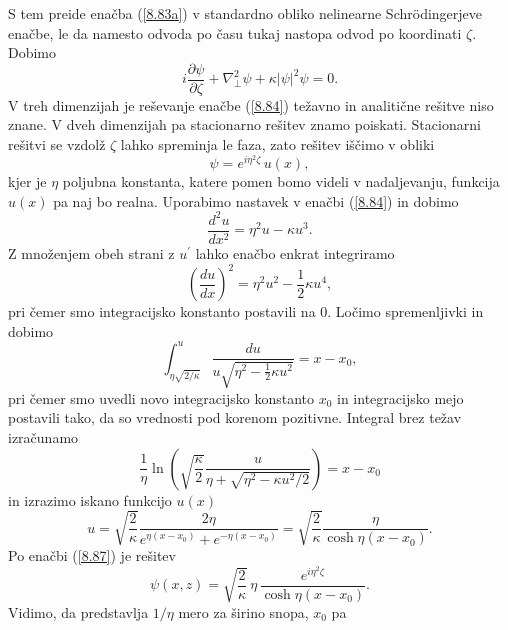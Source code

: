  S tem preide enačba (\ref{8.83a}) v standardno obliko nelinearne Schr\"odingerjeve
enačbe, le da namesto odvoda po času tukaj nastopa odvod po koordinati $\zeta$. Dobimo
\begin{equation}
i\frac{\partial\psi}{\partial\zeta}+\nabla_{\bot}^{2}\psi+\kappa\left|\psi\right|^{2}\psi=0.
\label{8.84}
\end{equation}
V treh dimenzijah je reševanje enačbe (\ref{8.84}) težavno in analitične
rešitve niso znane. V dveh dimenzijah pa stacionarno rešitev znamo
poiskati. Stacionarni rešitvi se vzdolž $\zeta$ lahko spreminja le faza, zato
rešitev iščimo v obliki 
\begin{equation}
\psi=e^{i\eta^{2}\zeta}\, u(x),
\label{8.87}
\end{equation}
 kjer je $\eta$ poljubna konstanta, katere pomen bomo videli v nadaljevanju, 
 funkcija $u(x)$ pa naj bo realna. 
Uporabimo nastavek v enačbi (\ref{8.84}) in dobimo
\begin{equation}
\frac{d^{2}u}{dx^{2}}=\eta^{2}u-\kappa u^{3}.
\end{equation}
 Z množenjem obeh strani z $u^{\prime}$ lahko enačbo enkrat integriramo
\begin{equation}
\left(\frac{du}{dx}\right)^{2}=\eta^{2}u^{2}-\frac{1}{2}\kappa u^{4},
\end{equation}
pri čemer smo integracijsko konstanto postavili na 0.
Ločimo spremenljivki in dobimo 
\begin{equation}
\int_{\eta\sqrt{2/\kappa}}^{u}\frac{du}{u\sqrt{\eta^{2}-\frac{1}{2}\kappa u^{2}}}=x-x_{0},
\label{8.85}
\end{equation}
pri čemer smo uvedli novo integracijsko konstanto $x_{0}$ in integracijsko mejo postavili 
tako, da so vrednosti pod korenom pozitivne.
Integral brez težav izračunamo
\begin{equation}
\frac{1}{\eta}\ln\left(\sqrt{\frac{\kappa}{2}}\frac{u}{\eta+
\sqrt{\eta^{2}-\kappa u^{2}/2}}\right)=x-x_{0}
\end{equation}
in izrazimo iskano funkcijo $u(x)$
\begin{equation}
u=\sqrt{\frac{2}{\kappa}}\frac{2 \eta }{e^{\eta(x-x_{0})}+e^{-\eta(x-x_{0})}}=
\sqrt{\frac{2}{\kappa}}\frac{\eta}{\cosh\eta(x-x_{0})}.
\label{8.86}
\end{equation}
Po enačbi (\ref{8.87}) je rešitev
\begin{equation}
\psi(x,z)=\sqrt{\frac{2}{\kappa}}\,\eta\,\frac{e^{i\eta^{2}\zeta}}{\cosh\eta(x-x_{0})}.
\label{8.88}
\end{equation}
Vidimo, da predstavlja $1/\eta$ mero za širino snopa, $x_{0}$ pa
